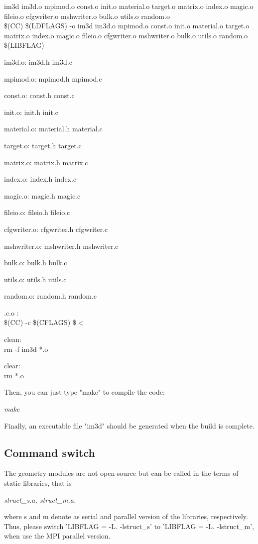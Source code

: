 im3d \: im3d.o mpimod.o const.o init.o material.o target.o matrix.o index.o magic.o fileio.o cfgwriter.o mshwriter.o bulk.o utils.o random.o\\
  \$(CC) \$(LDFLAGS) -o im3d im3d.o mpimod.o const.o init.o material.o target.o matrix.o index.o magic.o fileio.o cfgwriter.o mshwriter.o bulk.o utils.o random.o \$(LIBFLAG)

im3d.o: im3d.h im3d.c

mpimod.o: mpimod.h mpimod.c

const.o: const.h const.c

init.o: init.h init.c

material.o: material.h material.c

target.o: target.h target.c

matrix.o: matrix.h matrix.c

index.o: index.h index.c

magic.o: magic.h magic.c

fileio.o: fileio.h fileio.c

cfgwriter.o: cfgwriter.h cfgwriter.c

mshwriter.o: mshwriter.h mshwriter.c

bulk.o: bulk.h bulk.c

utils.o: utils.h utils.c

random.o: random.h random.c

.c.o :\\
	\$(CC) -c \$(CFLAGS) \$$<$

clean:\\
	rm -f im3d *.o

clear:\\
	rm *.o

Then, you can just type "make" to compile the code:

\quad \textsl{make}

Finally, an executable file "im3d" should be generated when the build is complete.

\subsection{Command switch}

The geometry modules are not open-source but can be called in the terms of static libraries, that is

\quad \textsl{struct\_s.a, struct\_m.a.}

where s and m denote as serial and parallel version of the libraries, respectively. Thus, please switch 'LIBFLAG = -L. -lstruct\_s' to 'LIBFLAG = -L. -lstruct\_m', when use the MPI parallel version.

